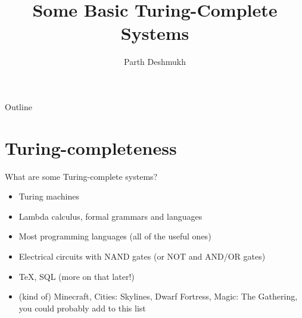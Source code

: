 \documentclass[aspectratio=169]{beamer}
\title{Some Basic Turing-Complete Systems}
\author{Parth Deshmukh}
\date{}
\begin{document}

\begin{frame}
\titlepage
\end{frame}

\begin{frame}{Outline}
  \tableofcontents
\end{frame}

\section{Turing-completeness}
\frame{\sectionpage}

\begin{frame}{What are some Turing-complete systems?}
    \begin{itemize}
        \pause
        \item Turing machines \pause
        \item Lambda calculus, formal grammars and languages \pause
        \item Most programming languages (all of the useful ones) \pause
        \item Electrical circuits with NAND gates (or NOT and AND/OR gates) \pause
        \item TeX, SQL (more on that later!) \pause
        \item (kind of) Minecraft, Cities: Skylines, Dwarf Fortress, Magic: The Gathering, you could probably add to this list
    \end{itemize}
\end{frame}
\end{document}
